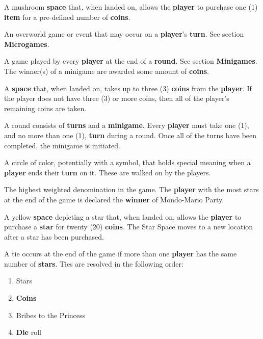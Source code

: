 \documentclass{article}
\begin{document}
\begin{description}[style=nextline]
\item[Item Store] A mushroom \textbf{space} that, when landed on,
allows the \textbf{player} to purchase one (1) \textbf{item} for a pre-defined
number of \textbf{coins}.

\item[Microgame] An overworld game or event that may occur on a \textbf{player}'s
\textbf{turn}. See section \textbf{Microgames}.

\item[Minigame] A game played by every \textbf{player} at the end of a \textbf{round}.
See section \textbf{Minigames}.  The winner(s) of a minigame are awarded
some amount of \textbf{coins}.

\item[Red Space] A \textbf{space} that, when landed on, takes up to
three (3) \textbf{coins} from the \textbf{player}.  If the player does
not have three (3) or more coins, then all of the player's remaining
coins are taken.

\item[Round] A round consists of \textbf{turns} and a \textbf{minigame}.
Every \textbf{player} must take one (1), and no more than one (1),
\textbf{turn} during a round.  Once all of the turns have been completed,
the minigame is initiated.

\item[Space] A circle of color, potentially with a symbol, that holds
special meaning when a \textbf{player} ends their \textbf{turn} on it.
These are walked on by the players.

\item[Star] The highest weighted denomination in the game.  The \textbf{player}
with the most stars at the end of the game is declared the \textbf{winner}
of Mondo-Mario Party.

\item[Star Space] A yellow \textbf{space} depicting a star that, when landed
on, allows the \textbf{player} to purchase a \textbf{star} for twenty (20)
\textbf{coins}.  The Star Space moves to a new location after a star has been
purchased.

\item[Tie] A tie occurs at the end of the game if more than one \textbf{player}
has the same number of \textbf{stars}.  Ties are resolved in the following order:
\begin{enumerate}
\item Stars
\item \textbf{Coins}
\item Bribes to the Princess
\item \textbf{Die} roll
\end{enumerate}


\end{description}
\end{document}
